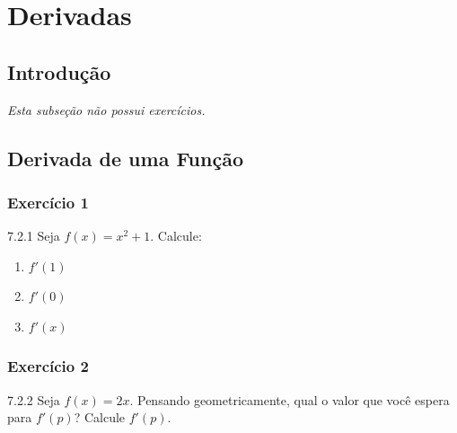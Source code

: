 \setcounter{section}{6}
\setcounter{subsection}{0}

\section{Derivadas}


\ocultarsubsub

\subsection{Introdução}
\textit{Esta subseção não possui exercícios.}

\clearpage

\subsection{Derivada de uma Função}

{}
{}

\subsubsection*{Exercício 1}
\begin{exercicio}[1]{7.2.1}
Seja $f(x) = x^2 + 1$. Calcule:
\begin{enumerate}[label=\alph*)]
    \item $f'(1)$
    \item $f'(0)$
    \item $f'(x)$
\end{enumerate}
\end{exercicio}

\subsubsection*{Exercício 2}
\begin{exercicio}[2]{7.2.2}
Seja $f(x) = 2x$. Pensando geometricamente, qual o valor que você espera para $f'(p)$? Calcule $f'(p)$.
\end{exercicio}

